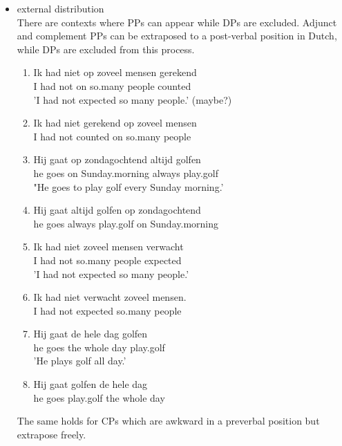 \documentclass{article}
\begin{document}
\begin{itemize}
\item external distribution\\
There are contexts where PPs can appear while DPs are excluded. Adjunct and complement PPs can be extraposed to a post-verbal position in Dutch, while DPs are excluded from this process.
\begin{example}
\label{}
\begin{enumerate}
\item
   \gll Ik had niet op zoveel mensen gerekend\\
I had not on so.many people counted\\
'I had not expected so many people.' (maybe?)\\
\item
\gll Ik had niet gerekend op zoveel mensen\\
I had not counted on so.many people\\
\item
\gll Hij gaat op zondagochtend altijd golfen\\
he goes on Sunday.morning always play.golf\\
"He goes to play golf every Sunday morning.' \\
\item
\gll Hij gaat altijd golfen op zondagochtend\\
he goes always play.golf on Sunday.morning\\
\item 
\gll Ik had niet zoveel mensen verwacht\\
I had not so.many people expected\\
'I had not expected so many people.'
\item
\gll *Ik had niet verwacht zoveel mensen.\\
I had not expected so.many people\\
\item 
\gll Hij gaat de hele dag golfen\\
he goes the whole day play.golf\\
'He plays golf all day.'\\
\item
\gll *Hij gaat golfen de hele dag\\
he goes play.golf the whole day\\
  \glt
   \glend
\end{enumerate}
   \end{example}
The same holds for CPs which are awkward in a preverbal position but extrapose freely.

\end{itemize}
\end{document}
